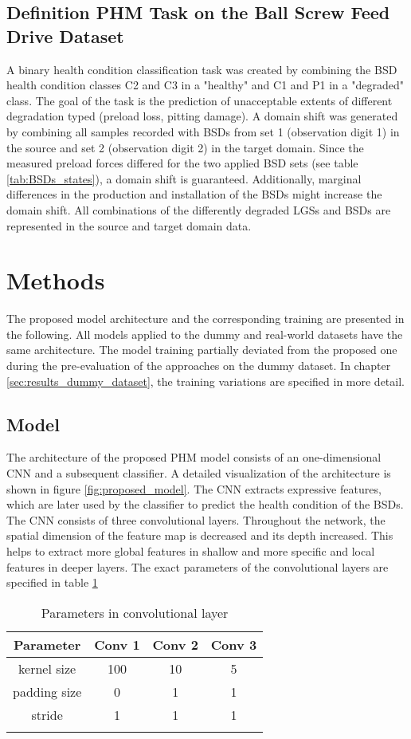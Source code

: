 \subsection{Definition PHM Task on the Ball Screw Feed Drive Dataset}\label{ch:PHM_Task_Definition}
A binary health condition classification task was created by combining the BSD health condition classes C2 and C3 in a "healthy" and C1 and P1 in a "degraded" class. The goal of the task is the prediction of unacceptable extents of different degradation typed (preload loss, pitting damage). A domain shift was generated by combining all samples recorded with BSDs from set 1 (observation digit 1) in the source and set 2 (observation digit 2) in the target domain. Since the measured preload forces differed for the two applied BSD sets (see table \ref{tab:BSDs_states}), a domain shift is guaranteed. Additionally, marginal differences in the production and installation of the BSDs might increase the domain shift. All combinations of the differently degraded LGSs and BSDs are represented in the source and target domain data. 


\section{Methods}\label{sec:methods}
The proposed model architecture and the corresponding training are presented in the following. All models applied to the dummy and real-world datasets have the same architecture. The model training partially deviated from the proposed one during the pre-evaluation of the approaches on the dummy dataset. In chapter \ref{sec:results_dummy_dataset}, the training variations are specified in more detail. 

\subsection{Model}
\label{sec:model}
The architecture of the proposed PHM model consists of an one-dimensional CNN and a subsequent classifier. A detailed visualization of the architecture is shown in figure \ref{fig:proposed_model}. The CNN extracts expressive features, which are later used by the classifier to predict the health condition of the BSDs. The CNN consists of three convolutional layers. Throughout the network, the spatial dimension of the feature map is decreased and its depth increased. This helps to extract more global features in shallow and more specific and local features in deeper layers. The exact parameters of the convolutional layers are specified in table \ref{tab:parameter_conv} 
\begin{longtable}{c c c c} 
\toprule
Parameter & Conv 1 & Conv 2 & Conv 3 \\
\midrule
kernel size & 100 & 10 & 5 \\

padding size & 0 & 1 & 1 \\

stride & 1 & 1 & 1 \\
\bottomrule
\caption {Parameters in convolutional layer}
\label {tab:parameter_conv}
\end{longtable}

